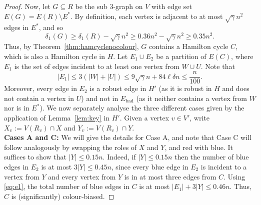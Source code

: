 \documentclass[A4paper,12pt]{article}
\theoremstyle{definition}
\begin{document}
\begin{proof}[Proof]
    Now, let $G\subseteq R$ be the sub $3$-graph on $V$ with edge set $E(G)=E(R)\setminus E^*$. 
     By definition, each vertex is adjacent to at most $\sqrt{\gamma}n^2$ edges in $E^*$, and so 
        \begin{equation*}
 \delta_1(G)\geq \delta_1(R)- \sqrt{\gamma}n^2 \geq 0.36n^2-\sqrt{\gamma}n^2\geq 0.35n^2.
    \end{equation*} 
    Thus, by Theorem~\ref{thm:hamcyclenocolour}, $G$ contains a Hamilton cycle $C$, which is also a Hamilton cycle in $H$. Let  $E_1\cup E_2$ be a partition of $E(C)$, where $E_1$ is the set of edges incident to at least one vertex from $W\cup U$. Note that 
\begin{equation}\label{eq:e1}
    |E_1|\leq 3(|W|+|U|)\leq 9\sqrt{\gamma}n+84\ell\delta  n\leq \frac{n}{100}.
\end{equation}
Moreover, every edge in $E_2$ is a robust edge in $H'$ (as it is robust in $H$ and does not contain a vertex in $U$) and not in $E_{\textrm{bad}}$ (as it neither contains a vertex from $W$ nor is in $E^*$).
   We now separately analyse the three different cases given by the application of Lemma~\ref{lem:key} in $H'$. Given a vertex $v\in V'$, write $X_v:=V(R_v)\cap X$ and $Y_v:=V(R_v)\cap Y$. \\
   
   \noindent \textbf{Cases A and C:} We will give the details for Case A, and note that Case C will follow analogously by swapping the roles of $X$ and $Y$, and red with blue. It suffices to show that $|Y|\le 0.15n$. Indeed, if $|Y|\le 0.15n$ then the number of blue edges in $E_2$ is at most $3|Y| \le 0.45n$, since every blue edge in $E_2$ is incident to a vertex from $Y$ and every vertex from $Y$ is in at most three edges from $C$. Using \eqref{eq:e1}, the total number of blue edges in $C$ is at most $|E_1|+3|Y|\leq0.46n$. Thus, $C$ is (significantly) colour-biased.
      

\end{proof}
\end{document}
